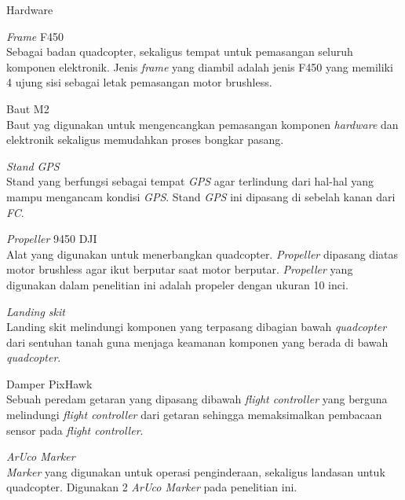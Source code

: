 \begin{packed_enum}
	\item Hardware
	\begin{packed_item}
		\item[a.] \textit{Frame} F450
		\\ Sebagai badan quadcopter, sekaligus tempat untuk pemasangan seluruh komponen elektronik. Jenis \textit{frame} yang diambil adalah jenis F450 yang memiliki 4 ujung sisi sebagai letak pemasangan motor brushless.
		\item [b.] Baut M2
		\\ Baut yag digunakan untuk mengencangkan pemasangan komponen \textit{hardware} dan elektronik sekaligus memudahkan proses bongkar pasang.
		\item [c.] \textit{Stand} \textit{GPS}
		\\ Stand yang berfungsi sebagai tempat \textit{GPS} agar terlindung dari hal-hal yang mampu mengancam kondisi \textit{GPS}. Stand \textit{GPS} ini dipasang di sebelah kanan dari \textit{FC}.
		\item [d.] \textit{Propeller} 9450 DJI
		\\ Alat yang digunakan untuk menerbangkan quadcopter. \textit{Propeller} dipasang diatas motor brushless agar ikut berputar saat motor berputar. \textit{Propeller} yang digunakan dalam penelitian ini adalah propeler dengan ukuran 10 inci.
		\item [e.] \textit{Landing skit}
		\\ Landing skit melindungi komponen yang terpasang dibagian bawah \textit{quadcopter} dari sentuhan tanah guna menjaga keamanan komponen yang berada di bawah \textit{quadcopter}.
		\item [f.] Damper PixHawk 
		\\ Sebuah peredam getaran yang dipasang dibawah \textit{flight controller} yang berguna melindungi \textit{flight controller} dari getaran sehingga memaksimalkan pembacaan sensor pada \textit{flight controller}.
		\item [g.] \textit{ArUco Marker}
		\\ \textit{Marker} yang digunakan untuk operasi penginderaan, sekaligus landasan untuk quadcopter. Digunakan 2 \textit{ArUco Marker} pada penelitian ini.
	\end{packed_item}
	

\end{packed_enum}
